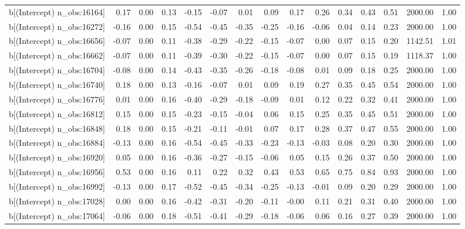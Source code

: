 \begin{table}[ht]
\begin{tabular}{rrrrrrrrrrrrrrr}
  b[(Intercept) n\_obs:16164] & 0.17 & 0.00 & 0.13 & -0.15 & -0.07 & 0.01 & 0.09 & 0.17 & 0.26 & 0.34 & 0.43 & 0.51 & 2000.00 & 1.00 \\ 
  b[(Intercept) n\_obs:16272] & -0.16 & 0.00 & 0.15 & -0.54 & -0.45 & -0.35 & -0.25 & -0.16 & -0.06 & 0.04 & 0.14 & 0.23 & 2000.00 & 1.00 \\ 
  b[(Intercept) n\_obs:16656] & -0.07 & 0.00 & 0.11 & -0.38 & -0.29 & -0.22 & -0.15 & -0.07 & 0.00 & 0.07 & 0.15 & 0.20 & 1142.51 & 1.01 \\ 
  b[(Intercept) n\_obs:16662] & -0.07 & 0.00 & 0.11 & -0.39 & -0.30 & -0.22 & -0.15 & -0.07 & 0.00 & 0.07 & 0.15 & 0.19 & 1118.37 & 1.00 \\ 
  b[(Intercept) n\_obs:16704] & -0.08 & 0.00 & 0.14 & -0.43 & -0.35 & -0.26 & -0.18 & -0.08 & 0.01 & 0.09 & 0.18 & 0.25 & 2000.00 & 1.00 \\ 
  b[(Intercept) n\_obs:16740] & 0.18 & 0.00 & 0.13 & -0.16 & -0.07 & 0.01 & 0.09 & 0.19 & 0.27 & 0.35 & 0.45 & 0.54 & 2000.00 & 1.00 \\ 
  b[(Intercept) n\_obs:16776] & 0.01 & 0.00 & 0.16 & -0.40 & -0.29 & -0.18 & -0.09 & 0.01 & 0.12 & 0.22 & 0.32 & 0.41 & 2000.00 & 1.00 \\ 
  b[(Intercept) n\_obs:16812] & 0.15 & 0.00 & 0.15 & -0.23 & -0.15 & -0.04 & 0.06 & 0.15 & 0.25 & 0.35 & 0.45 & 0.51 & 2000.00 & 1.00 \\ 
  b[(Intercept) n\_obs:16848] & 0.18 & 0.00 & 0.15 & -0.21 & -0.11 & -0.01 & 0.07 & 0.17 & 0.28 & 0.37 & 0.47 & 0.55 & 2000.00 & 1.00 \\ 
  b[(Intercept) n\_obs:16884] & -0.13 & 0.00 & 0.16 & -0.54 & -0.45 & -0.33 & -0.23 & -0.13 & -0.03 & 0.08 & 0.20 & 0.30 & 2000.00 & 1.00 \\ 
  b[(Intercept) n\_obs:16920] & 0.05 & 0.00 & 0.16 & -0.36 & -0.27 & -0.15 & -0.06 & 0.05 & 0.15 & 0.26 & 0.37 & 0.50 & 2000.00 & 1.00 \\ 
  b[(Intercept) n\_obs:16956] & 0.53 & 0.00 & 0.16 & 0.11 & 0.22 & 0.32 & 0.43 & 0.53 & 0.65 & 0.75 & 0.84 & 0.93 & 2000.00 & 1.00 \\ 
  b[(Intercept) n\_obs:16992] & -0.13 & 0.00 & 0.17 & -0.52 & -0.45 & -0.34 & -0.25 & -0.13 & -0.01 & 0.09 & 0.20 & 0.29 & 2000.00 & 1.00 \\ 
  b[(Intercept) n\_obs:17028] & 0.00 & 0.00 & 0.16 & -0.42 & -0.31 & -0.20 & -0.11 & -0.00 & 0.11 & 0.21 & 0.31 & 0.40 & 2000.00 & 1.00 \\ 
  b[(Intercept) n\_obs:17064] & -0.06 & 0.00 & 0.18 & -0.51 & -0.41 & -0.29 & -0.18 & -0.06 & 0.06 & 0.16 & 0.27 & 0.39 & 2000.00 & 1.00 \\ 

\end{tabular}
\end{table}
